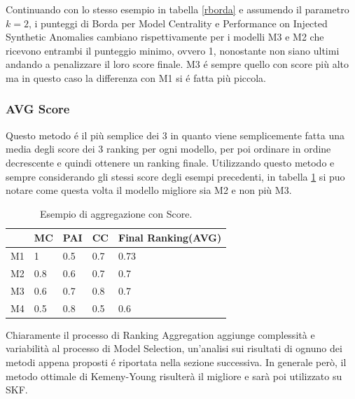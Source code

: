 Continuando con lo stesso esempio in tabella \ref{rborda} e assumendo il parametro \(k=2\), i punteggi di Borda per Model Centrality e Performance on Injected Synthetic Anomalies cambiano rispettivamente per i modelli M3 e M2 che ricevono entrambi il punteggio minimo, ovvero 1, nonostante non siano ultimi andando a penalizzare il loro score finale. M3 é sempre quello con score più alto ma in questo caso la differenza con M1 si é fatta più piccola.

\subsubsection{AVG Score}
Questo metodo é il più semplice dei 3 in quanto viene semplicemente fatta una media degli score dei 3 ranking per ogni modello, per poi ordinare in ordine decrescente e quindi ottenere un ranking finale.
Utilizzando questo metodo e sempre considerando gli stessi score degli esempi precedenti, in tabella \ref{score} si puo notare come questa volta il modello migliore sia M2 e non più M3.

\begin{table}
	
	\centering
	\begin{tabular}{|l|l|l|l|l|}
		\hline
		   & MC  & PAI & CC  & Final Ranking(AVG) \\ \hline
		M1 & 1   & 0.5 & 0.7 & 0.73               \\ \hline
		M2 & 0.8 & 0.6 & 0.7 & 0.7                \\ \hline
		M3 & 0.6 & 0.7 & 0.8 & 0.7                \\ \hline
		M4 & 0.5 & 0.8 & 0.5 & 0.6                \\ \hline
	\end{tabular}
	\caption{\label{score}Esempio di aggregazione con Score.}
\end{table}


Chiaramente il processo di Ranking Aggregation aggiunge complessità e variabilità al processo di Model Selection, un'analisi sui risultati di ognuno dei metodi appena proposti é riportata nella sezione successiva. In generale però, il metodo ottimale di Kemeny-Young risulterà il migliore e sarà poi utilizzato su SKF.


